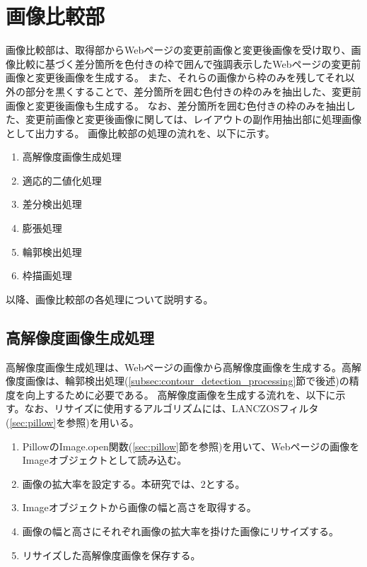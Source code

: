 \section{画像比較部}\label{sec:Difference_extraction_section}
画像比較部は、取得部からWebページの変更前画像と変更後画像を受け取り、画像比較に基づく差分箇所を色付きの枠で囲んで強調表示したWebページの変更前画像と変更後画像を生成する。
また、それらの画像から枠のみを残してそれ以外の部分を黒くすることで、差分箇所を囲む色付きの枠のみを抽出した、変更前画像と変更後画像も生成する。
なお、差分箇所を囲む色付きの枠のみを抽出した、変更前画像と変更後画像に関しては、レイアウトの副作用抽出部に処理画像として出力する。
画像比較部の処理の流れを、以下に示す。
\begin{enumerate}
    \item 高解像度画像生成処理
    \item 適応的二値化処理
    \item 差分検出処理
    \item 膨張処理
    \item 輪郭検出処理
    \item 枠描画処理
\end{enumerate}
以降、画像比較部の各処理について説明する。

\subsection{高解像度画像生成処理}\label{subsec:Generate_high_images}
高解像度画像生成処理は、Webページの画像から高解像度画像を生成する。高解像度画像は、輪郭検出処理(\ref{subsec:contour_detection_processing}節で後述)の精度を向上するために必要である。
高解像度画像を生成する流れを、以下に示す。なお、リサイズに使用するアルゴリズムには、LANCZOSフィルタ(\ref{sec:pillow}を参照)を用いる。
\begin{enumerate}
    \item PillowのImage.open関数(\ref{sec:pillow}節を参照)を用いて、Webページの画像をImageオブジェクトとして読み込む。
    \item 画像の拡大率を設定する。本研究では、$2$とする。
    \item Imageオブジェクトから画像の幅と高さを取得する。
    \item 画像の幅と高さにそれぞれ画像の拡大率を掛けた画像にリサイズする。
    \item リサイズした高解像度画像を保存する。
\end{enumerate}

